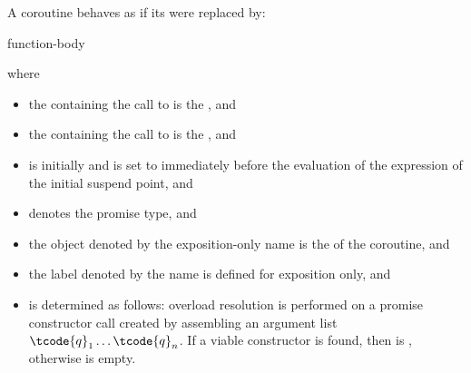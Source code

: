\pnum
A coroutine behaves as if its  were replaced by:
\begin{ncsimplebnf}
\terminal{\{}\br
\bnfindent {}   \terminal{;}\br
\bnfindent {} \terminal{\{}\br
\bnfindent\bnfindent {}  \terminal{;}\br
\bnfindent\bnfindent function-body\br
\bnfindent {}\br
\bnfindent\bnfindent {}\br
\bnfindent\bnfindent\bnfindent {} \terminal{;}\br
\bnfindent\bnfindent {} \terminal{;}\br
\bnfindent \terminal{\}}\br
{} \terminal{:}\br
\bnfindent {}  \terminal{;}\br
\terminal{\}}
\end{ncsimplebnf}
where
\begin{itemize}
\item
the  containing
the call to 
is the , and
\item
the  containing
the call to 
is the , and
\item
{}
is initially  and is set to 
immediately before the evaluation
of the  expression
of the initial suspend point, and
\item
{} denotes the promise type, and
\item
the object denoted by the exposition-only name 
is the  of the coroutine, and
\item
the label denoted by the name 
is defined for exposition only, and
\item
{} is determined as follows:
overload resolution is performed on a promise constructor call created by
assembling an argument list $\tcode{q}_1 \dotsc \tcode{q}_n$. If a viable
constructor is found, then
 is
, otherwise
 is empty.
\end{itemize}

